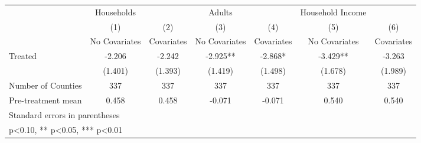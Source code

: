{
\def\sym#1{\ifmmode^{#1}\else\(^{#1}\)\fi}
\begin{tabular}{l*{6}{c}}
\hline\hline
            &  Households   &               &      Adults   &               &Household Income   &               \\
            &\multicolumn{1}{c}{(1)}&\multicolumn{1}{c}{(2)}&\multicolumn{1}{c}{(3)}&\multicolumn{1}{c}{(4)}&\multicolumn{1}{c}{(5)}&\multicolumn{1}{c}{(6)}\\
            &\multicolumn{1}{c}{No Covariates}&\multicolumn{1}{c}{Covariates}&\multicolumn{1}{c}{No Covariates}&\multicolumn{1}{c}{Covariates}&\multicolumn{1}{c}{No Covariates}&\multicolumn{1}{c}{Covariates}\\
\hline
Treated     &      -2.206   &      -2.242   &      -2.925** &      -2.868*  &      -3.429** &      -3.263   \\
            &     (1.401)   &     (1.393)   &     (1.419)   &     (1.498)   &     (1.678)   &     (1.989)   \\
\hline
Number of Counties&         337   &         337   &         337   &         337   &         337   &         337   \\
Pre-treatment mean&       0.458   &       0.458   &      -0.071   &      -0.071   &       0.540   &       0.540   \\
\hline\hline
\multicolumn{7}{l}{\footnotesize Standard errors in parentheses}\\
\multicolumn{7}{l}{\footnotesize * p<0.10, ** p<0.05, *** p<0.01}\\
\end{tabular}
}
